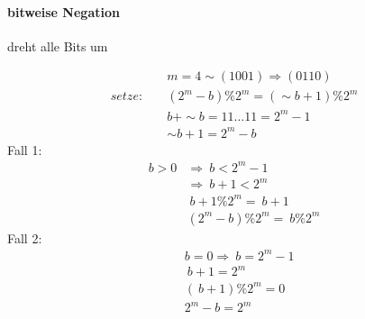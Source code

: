 \documentclass{article}
\begin{document}
\paragraph{bitweise Negation}

	dreht alle Bits um

	\begin{align}
		& m=4 \sim (1001) \Rightarrow (0110) \\
		setze: \quad & (2^m -b) \% 2^m = (\sim b+1) \% 2^m \\
		& b + \sim b = 11 \dots 11 = 2^m-1 \\
		& \sim b+1 = 2^m-b
	\end{align}
	Fall 1:
	\begin{align*}
		b > 0 &\Rightarrow ~b < 2^m-1 \\
		& \Rightarrow ~b+1 < 2^m \\
		& ~b+1 \% 2^m = ~b+1 \\
		& (2^m -b) \% 2^m = ~b \% 2^m
	\end{align*}
	Fall 2:
	\begin{align*}
		& b=0 \Rightarrow ~b = 2^m-1 \\
		& ~b+1 = 2^m \\
		& (~b+1) \% 2^m = 0 \\
		& 2^m - b = 2^m \\
	\end{align*}
\end{document}
